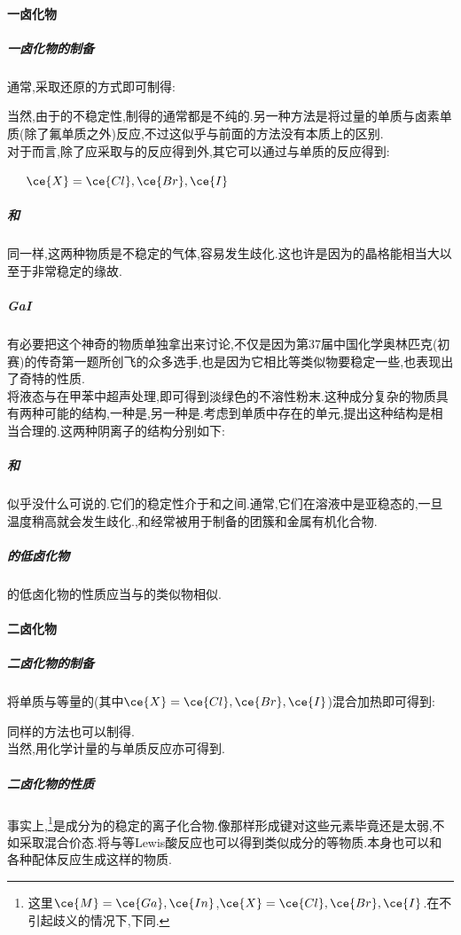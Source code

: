 \documentclass{ctexart}
\begin{document}
\paragraph{一卤化物}
\subparagraph{一卤化物的制备}
通常,采取还原的方式即可制得:
\begin{center}
\end{center}
当然,由于的不稳定性,制得的通常都是不纯的.另一种方法是将过量的单质与卤素单质(除了氟单质之外)反应,不过这似乎与前面的方法没有本质上的区别.\\
\indent 对于而言,除了应采取与的反应得到外,其它可以通过与单质的反应得到:
\begin{center}
    \ \ \ $\ce{X}=\ce{Cl},\ce{Br},\ce{I}$
\end{center}
\subparagraph{和}
同一样,这两种物质是不稳定的气体,容易发生歧化.这也许是因为的晶格能相当大以至于非常稳定的缘故.
\subparagraph{GaI}
有必要把这个神奇的物质单独拿出来讨论,不仅是因为第37届中国化学奥林匹克(初赛)的传奇第一题所创飞的众多选手,也是因为它相比等类似物要稳定一些,也表现出了奇特的性质.\\
\indent 将液态与在甲苯中超声处理,即可得到淡绿色的不溶性粉末.这种成分复杂的物质具有两种可能的结构,一种是\ce{[Ga2][Ga]+[GaI4]-},另一种是.考虑到单质中存在的单元,提出这种结构是相当合理的.这两种阴离子的结构分别如下:
\subparagraph{和}
似乎没什么可说的.它们的稳定性介于和之间.通常,它们在溶液中是亚稳态的,一旦温度稍高就会发生歧化.,和经常被用于制备的团簇和金属有机化合物.
\subparagraph{的低卤化物}
的低卤化物的性质应当与的类似物相似.
\paragraph{二卤化物}
\subparagraph{二卤化物的制备}
将单质与等量的(其中$\ce{X}=\ce{Cl},\ce{Br},\ce{I}$)混合加热即可得到:
\begin{center}
\end{center}
同样的方法也可以制得.\\
\indent 当然,用化学计量的与单质反应亦可得到.
\begin{center}
\end{center}
\subparagraph{二卤化物的性质}
事实上,\footnote{这里$\ce{M}=\ce{Ga},\ce{In}$,$\ce{X}=\ce{Cl},\ce{Br},\ce{I}$.在不引起歧义的情况下,下同.}是成分为的稳定的离子化合物.像那样形成键对这些元素毕竟还是太弱,不如采取混合价态.将与等Lewis酸反应也可以得到类似成分的\ce{[M]+[AlX4]-}等物质.本身也可以和各种配体反应生成\ce{[GaL4]+[GaX4]-}这样的物质.
\end{document}
